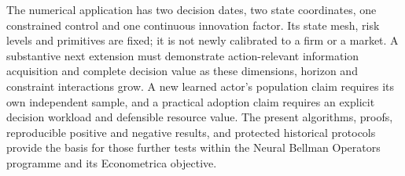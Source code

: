 The numerical application has two decision dates, two state coordinates,
one constrained control and one continuous innovation factor. Its state mesh,
risk levels and primitives are fixed; it is not newly calibrated to a firm or
a market. A substantive next extension must demonstrate action-relevant
information acquisition and complete decision value as these dimensions,
horizon and constraint interactions grow. A new learned actor's population
claim requires its own independent sample, and a practical adoption claim
requires an explicit decision workload and defensible resource value. The
present algorithms, proofs, reproducible positive and negative results, and
protected historical protocols provide the basis for those further tests
within the Neural Bellman Operators programme and its Econometrica objective.
